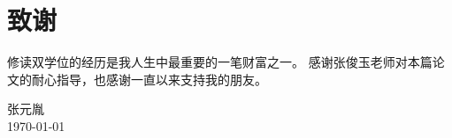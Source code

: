 
\chapter{致谢}

	修读双学位的经历是我人生中最重要的一笔财富之一。
	感谢张俊玉老师对本篇论文的耐心指导，也感谢一直以来支持我的朋友。

\vskip 108pt
\begin{flushright}
	张元胤\makebox[1cm]{} \\
\today
\end{flushright}

